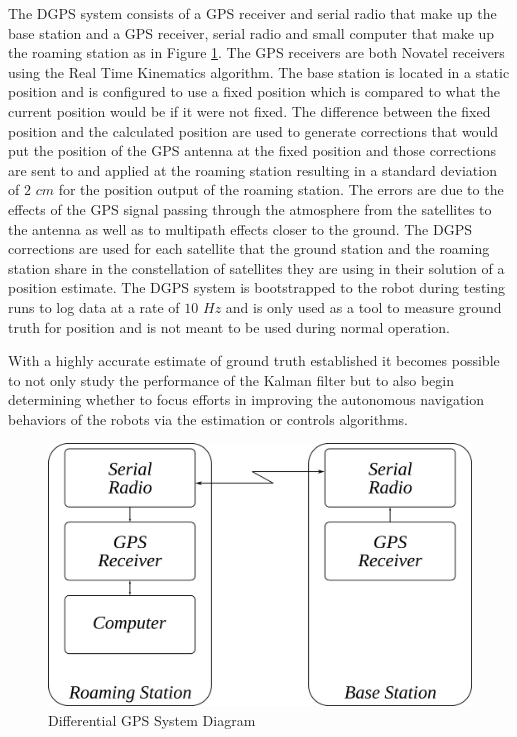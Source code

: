 The DGPS system consists of a GPS receiver and serial radio that make up the base station and a GPS receiver, serial radio and small computer that make up the roaming station as in Figure \ref{fig:dgps}. The GPS receivers are both Novatel receivers using the Real Time Kinematics algorithm. The base station is located in a static position and is configured to use a fixed position which is compared to what the current position would be if it were not fixed. The difference between the fixed position and the calculated position are used to generate corrections that would put the position of the GPS antenna at the fixed position and those corrections are sent to and applied at the roaming station resulting in a standard deviation of $2$ $cm$ for the position output of the roaming station. The errors are due to the effects of the GPS signal passing through the atmosphere from the satellites to the antenna as well as to multipath effects closer to the ground. The DGPS corrections are used for each satellite that the ground station and the roaming station share in the constellation of satellites they are using in their solution of a position estimate. The DGPS system is bootstrapped to the robot during testing runs to log data at a rate of $10$ $Hz$ and is only used as a tool to measure ground truth for position and is not meant to be used during normal operation.

With a highly accurate estimate of ground truth established it becomes possible to not only study the performance of the Kalman filter but to also begin determining whether to focus efforts in improving the autonomous navigation behaviors of the robots via the estimation or controls algorithms.

\begin{figure}[ht!]
	\centering
	\includegraphics[width=.6\textwidth]{images/dgps}
	\caption{Differential GPS System Diagram}
	\label{fig:dgps}
\end{figure}

